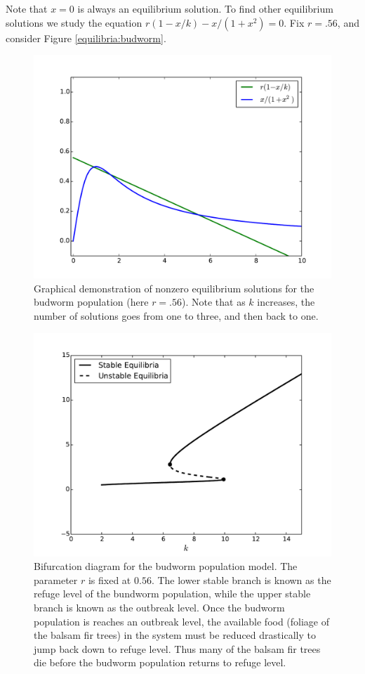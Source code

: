 Note that $x = 0$ is always an equilibrium solution.
To find other equilibrium solutions we study the equation $r(1-x/k)-x/(1+x^2) = 0$.
Fix $r = .56$, and consider Figure \eqref{equilibria:budworm}. 

\begin{figure}[ht]
\centering
\includegraphics[width=\textwidth]{BudwormEquilibria.pdf}
\caption{Graphical demonstration of nonzero equilibrium solutions for the budworm population (here $r = .56$).
Note that as $k$ increases, the number of solutions goes from one to three, and then back to one. }
\label{equilibria:budworm}
\end{figure}

\begin{figure}[ht]
\centering
\includegraphics[width=\textwidth]{BudwormPopulation.pdf}
\caption{Bifurcation diagram for the budworm population model.
The parameter $r$ is fixed at $0.56.$
The lower stable branch is known as the refuge level of the bundworm population, while the upper stable branch is known as the outbreak level.
Once the budworm population is reaches an outbreak level, the available food (foliage of the balsam fir trees) in the system must be reduced drastically to jump back down to refuge level.
Thus many of the balsam fir trees die before the budworm population returns to refuge level.}
\label{bifurcation:budworm}
\end{figure}

